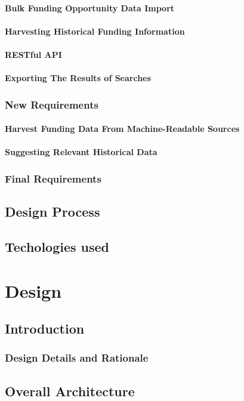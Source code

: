 \subsubsection{Bulk Funding Opportunity Data Import}
\subsubsection{Harvesting Historical Funding Information}
\subsubsection{RESTful API}
\subsubsection{Exporting The Results of Searches}
\subsection{New Requirements}
\subsubsection{Harvest Funding Data From Machine-Readable Sources}
\subsubsection{Suggesting Relevant Historical Data}
\subsection{Final Requirements}
\section{Design Process}
\section{Techologies used}
\chapter{Design}
\section{Introduction}
\subsection{Design Details and Rationale}
\section{Overall Architecture}
